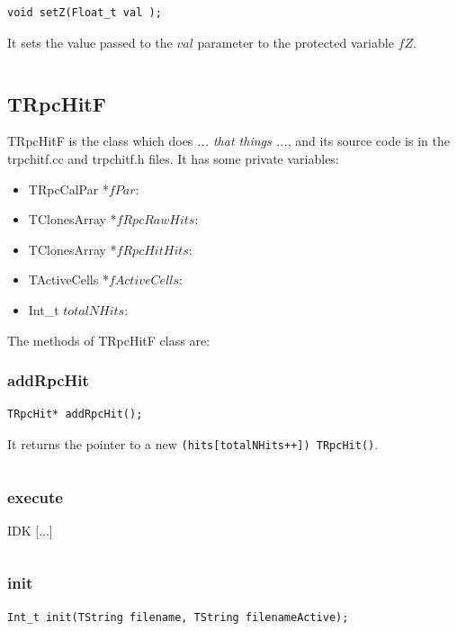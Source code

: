 \documentclass[a4paper]{book}
\begin{document}
\begin{lstlisting}[style=customc]
void setZ(Float_t val );
\end{lstlisting}

It sets the value passed to the $val$ parameter to the protected variable $fZ$.

\[\]

\subsection{TRpcHitF}

TRpcHitF is the class which does \textit{... that things ...}, and its source code is in the trpchitf.cc and trpchitf.h files. It has some private variables:

\begin{itemize}
    \item TRpcCalPar *$fPar$: 
    \item TClonesArray *$fRpcRawHits$: 
    \item TClonesArray *$fRpcHitHits$: 
    \item TActiveCells *$fActiveCells$: 
    \item Int\_t $totalNHits$: 
\end{itemize}

The methods of TRpcHitF class are:

\subsubsection{addRpcHit}

\begin{lstlisting}[style=customc]
TRpcHit* addRpcHit();
\end{lstlisting}

It returns the pointer to a new \texttt{(hits[totalNHits++]) TRpcHit()}.

\[\]

\subsubsection{execute}

IDK [...]

\[\]

\subsubsection{init}

\begin{lstlisting}[style=customc]
Int_t init(TString filename, TString filenameActive);
\end{lstlisting}
\end{document}
